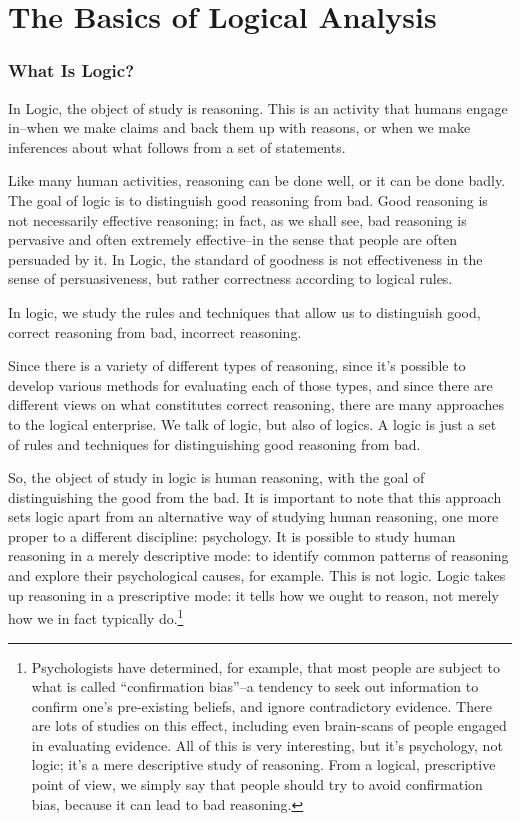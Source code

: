 \chapter{The Basics of Logical Analysis}

\subsection{What Is Logic?}
In Logic, the object of study is reasoning. This is an activity that humans engage in--when we
make claims and back them up with reasons, or when we make inferences about what follows from
a set of statements.

Like many human activities, reasoning can be done well, or it can be done badly. The goal of logic
is to distinguish good reasoning from bad. Good reasoning is not necessarily effective reasoning;
in fact, as we shall see, bad reasoning is pervasive and often extremely effective--in the sense that
people are often persuaded by it. In Logic, the standard of goodness is not effectiveness in the
sense of persuasiveness, but rather correctness according to logical rules.

In logic, we study the rules and techniques that allow us to distinguish good, correct reasoning
from bad, incorrect reasoning.

Since there is a variety of different types of reasoning, since it's possible to develop various
methods for evaluating each of those types, and since there are different views on what constitutes
correct reasoning, there are many approaches to the logical enterprise. We talk of logic, but also
of logics. A logic is just a set of rules and techniques for distinguishing good reasoning from bad.

So, the object of study in logic is human reasoning, with the goal of distinguishing the good from 
the bad. It is important to note that this approach sets logic apart from an alternative way of 
studying human reasoning, one more proper to a different discipline: psychology. It is possible to 
study human reasoning in a merely descriptive mode: to identify common patterns of reasoning and 
explore their psychological causes, for example. This is not logic. Logic takes up reasoning in a 
prescriptive mode: it tells how we ought to reason, not merely how we in fact typically 
do.\footnote{Psychologists have determined, for example, that most people are subject to what is 
called ``confirmation bias''--a tendency to seek out information to confirm one's pre-existing beliefs, 
and ignore contradictory evidence. There are lots of studies on this effect, including even 
brain-scans of people engaged in evaluating evidence. All of this is very interesting, but it's 
psychology, not logic; it's a mere descriptive study of reasoning. From a logical, prescriptive point 
of view, we simply say that people should try to avoid confirmation bias, because it can lead to bad 
reasoning.}

